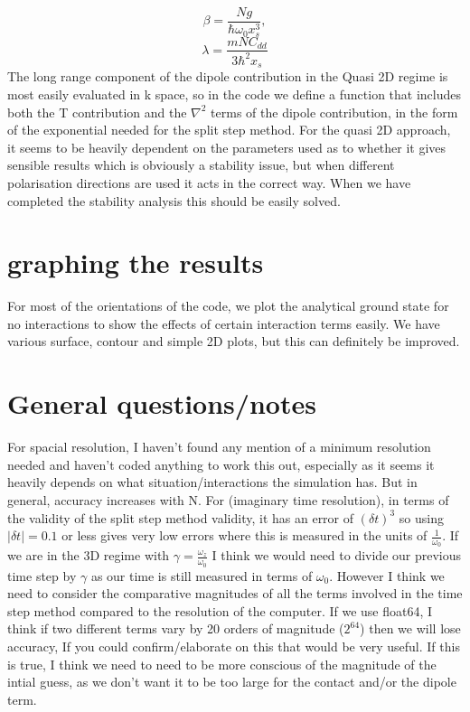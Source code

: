 \documentclass[12pt]{article}
\begin{document}
\begin{equation}
\beta=\frac{Ng}{\hbar\omega_{0}x_{s}^{3}},
\end{equation}
\begin{equation}
\lambda=\frac{mNC_{dd}}{3\hbar^{2}x_{s}}
\end{equation}
The long range component of the dipole contribution in the Quasi 2D regime is most easily evaluated in k space, so in the code we define a function that includes both the T contribution and the $\nabla^{2}$ terms of the dipole contribution, in the form of the exponential needed for the split step method.
For the quasi 2D approach, it seems to be heavily dependent on the parameters used as to whether it gives sensible results which is obviously a stability issue, but when different polarisation directions are used it acts in the correct way. When we have completed the stability analysis this should be easily solved.
\section{graphing the results}
For most of the orientations of the code, we plot the analytical ground state for no interactions to show the effects of certain interaction terms easily. We have various surface, contour and simple 2D plots, but this can definitely be improved. 
\section{General questions/notes}
For spacial resolution, I haven't found any mention of a minimum resolution needed and haven't coded anything to work this out, especially as it seems it heavily depends on what situation/interactions the simulation has. But in general, accuracy increases with N.
For (imaginary time resolution), in terms of the validity of the split step method validity, it has an error of $(\delta t)^{3}$ so using $|\delta t| = 0.1$ or less gives very low errors where this is measured in the units of $\frac{1}{\omega_{0}}$. If we are in the 3D regime with $\gamma=\frac{\omega_{z}}{\omega_{0}}$ I think we would need to divide our previous time step by $\gamma$ as our time is still measured in terms of $\omega_{0}$. However I think we need to consider the comparative magnitudes of all the terms involved in the time step method compared to the resolution of the computer. If we use float64, I think if two different terms vary by 20 orders of magnitude ($2^{64}$) then we will lose accuracy, If you could confirm/elaborate on this that would be very useful. If this is true, I think we need to need to be more conscious of the magnitude of the intial guess, as we don't want it to be too large for the contact and/or the dipole term. 
\end{document}
